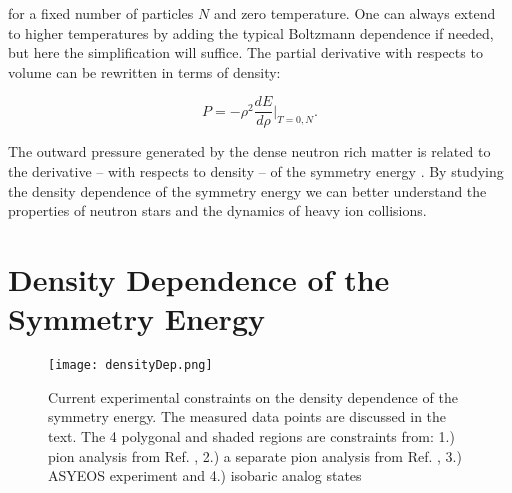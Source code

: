 for a fixed number of particles $N$ and zero temperature. One can always extend to higher temperatures by adding the typical Boltzmann dependence if needed, but here the simplification will suffice. The partial derivative with respects to volume can be rewritten in terms of density:

\begin{equation}
P = -\rho^2 \frac{dE}{d\rho}\vert_{T=0,N}.
\label{eq:densEos}
\end{equation}

The outward pressure generated  by the dense neutron rich matter is related to the derivative -- with respects to density  -- of the symmetry energy \cite{tovEq}. By studying the density dependence of the symmetry energy we can better understand the properties of neutron stars and the dynamics of heavy ion collisions. 

\section{Density Dependence of the Symmetry Energy}

\begin{figure}[!htb]
\centering
\texttt{[image: densityDep.png]}
\caption{Current experimental constraints on the density dependence of the symmetry energy. The measured data points are discussed in the text. The 4 polygonal and shaded regions are constraints from: 1.) pion analysis from Ref. \cite{xia2009,xie2013}, 2.) a separate pion analysis from Ref. \cite{feng2010}, 3.) ASYEOS experiment \cite{russo2011, russo2016, cozma2013} and 4.) isobaric analog states \cite{dan2014} }
\label{fig:symDen}
\end{figure}

